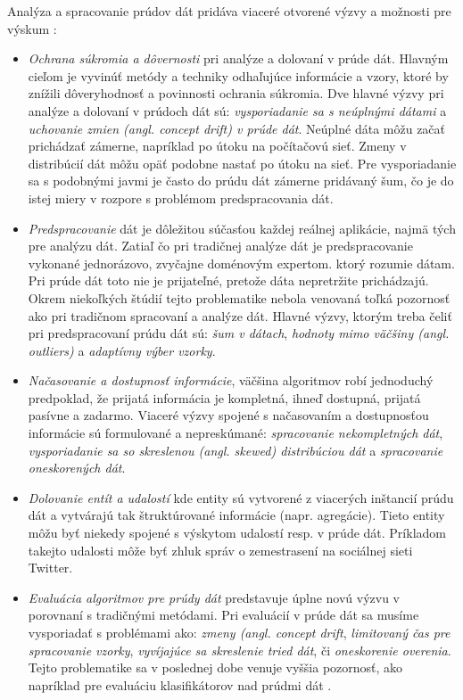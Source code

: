 Analýza a spracovanie prúdov dát pridáva viaceré otvorené výzvy a možnosti pre výskum \citep{krempl2014open}:  %
\begin{itemize}
	\item \textit{Ochrana súkromia a dôvernosti} pri analýze a dolovaní v prúde dát. Hlavným cieľom je vyvinúť metódy a techniky odhaľujúce informácie a vzory, ktoré by znížili dôveryhodnosť a povinnosti ochrania súkromia. Dve hlavné výzvy pri analýze a dolovaní v prúdoch dát sú: \textit{vysporiadanie sa s neúplnými dátami} a \textit{uchovanie zmien (angl. concept drift) v prúde dát}. Neúplné dáta môžu začať prichádzať zámerne, napríklad po útoku na počítačovú sieť. Zmeny v distribúcií dát môžu opäť podobne nastať po útoku na sieť. Pre vysporiadanie sa s podobnými javmi je často do prúdu dát zámerne pridávaný šum, čo je do istej miery v rozpore s problémom predspracovania dát.
	\item \textit{Predspracovanie} dát je dôležitou súčasťou každej reálnej aplikácie, najmä tých pre analýzu dát. Zatiaľ čo pri tradičnej analýze dát je predspracovanie vykonané jednorázovo, zvyčajne doménovým expertom. ktorý rozumie dátam. Pri prúde dát toto nie je prijateľné, pretože dáta nepretržite prichádzajú. Okrem niekoľkých štúdií \citep{zliobaite2014adaptive, anagnostopoulos2008deciding} tejto problematike nebola venovaná toľká pozornosť ako pri tradičnom spracovaní a analýze dát. Hlavné výzvy, ktorým treba čeliť pri predspracovaní prúdu dát sú: \textit{šum v dátach}, \textit{hodnoty mimo väčšiny (angl. outliers)} a \textit{adaptívny výber vzorky}.
	\item \textit{Načasovanie a dostupnosť informácie}, väčšina algoritmov robí jednoduchý predpoklad, že prijatá informácia je kompletná, ihneď dostupná, prijatá pasívne a zadarmo. Viaceré výzvy spojené s načasovaním a dostupnosťou informácie sú formulované a nepreskúmané: \textit{spracovanie nekompletných dát}, \textit{vysporiadanie sa so skreslenou (angl. skewed) distribúciou dát} a \textit{spracovanie oneskorených dát}.
	\item \textit{Dolovanie entít a udalostí} kde entity sú vytvorené z viacerých inštancií prúdu dát a vytvárajú tak štruktúrované informácie (napr. agregácie). Tieto entity môžu byť niekedy spojené s výskytom udalostí resp. v prúde dát. Príkladom takejto udalosti môže byť zhluk správ o zemestrasení na sociálnej sieti Twitter. 
	\item \textit{Evaluácia algoritmov pre prúdy dát} predstavuje úplne novú výzvu v porovnaní s tradičnými metódami. Pri evaluácií v prúde dát sa musíme vysporiadať s problémami ako: \textit{zmeny (angl. concept drift}, \textit{limitovaný čas pre spracovanie vzorky}, \textit{vyvíjajúce sa skreslenie tried dát}, či \textit{oneskorenie overenia}. Tejto problematike sa v poslednej dobe venuje vyššia pozornosť, ako napríklad pre evaluáciu klasifikátorov nad prúdmi dát \citep{bifet2015efficient}.

\end{itemize}
